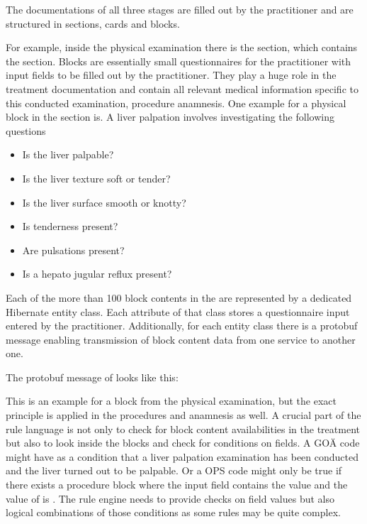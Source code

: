 The documentations of all three stages are filled out by the practitioner and are structured in sections,
cards and blocks.

For example, inside the physical examination there is the section,
which contains the  section.
Blocks are essentially small questionnaires for the practitioner with input fields to be filled out by the practitioner.
They play a huge role in the treatment documentation
and contain all relevant medical information specific to this conducted examination,
procedure anamnesis.
One example for a physical block in the section is.
A liver palpation involves investigating the following questions

\begin{itemize}
    \item Is the liver palpable?
    \item Is the liver texture soft or tender?
    \item Is the liver surface smooth or knotty?
    \item Is tenderness present?
    \item Are pulsations present?
    \item Is a hepato jugular reflux present?
\end{itemize}

Each of the more than 100 block contents in the \AVS are represented by a dedicated Hibernate entity class.
Each attribute of that class stores a questionnaire input entered by the practitioner.
Additionally,
for each entity class there is a protobuf message
enabling transmission of block content data from one service to another one.

The protobuf message of  looks like this:




This is an example for a block from the physical examination,
but the exact principle is applied in the procedures and anamnesis as well.
A crucial part of the rule language is not only to check for block content availabilities in the treatment
but also to look inside the blocks and check for conditions on fields.
A GOÄ code might have as a condition that a liver palpation examination has been conducted
and the liver turned out to be palpable.
Or a OPS code might only be true
if there exists a procedure block 
where the input field  contains the value  and the value of  is .
The rule engine needs
to provide checks on field values but also logical combinations of those conditions as some rules may be quite complex.

